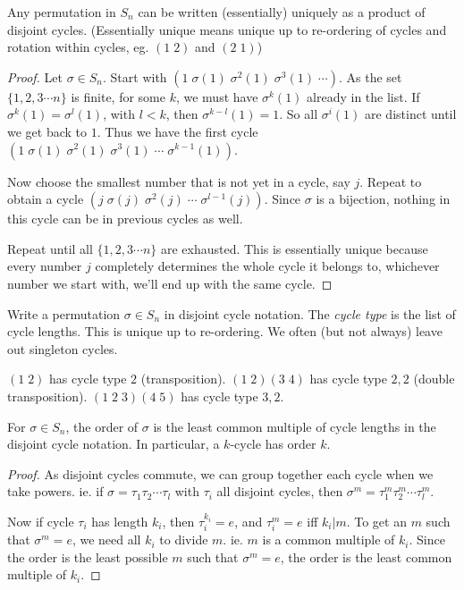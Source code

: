 \documentclass[a4paper]{article}
\begin{document}
\begin{thm}
  Any permutation in $S_n$ can be written (essentially) uniquely as a product of disjoint cycles. (Essentially unique means unique up to re-ordering of cycles and rotation within cycles, eg. $(1\; 2)$ and $(2\; 1)$)
\end{thm}

\begin{proof}
  Let $\sigma\in S_n$. Start with $(1\; \sigma(1)\; \sigma^2(1)\; \sigma^3(1)\;\cdots)$. As the set $\{1, 2, 3\cdots n\}$ is finite, for some $k$, we must have $\sigma^k(1)$ already in the list. If $\sigma^k(1) = \sigma^l(1)$, with $l < k$, then $\sigma^{k-l}(1) = 1$. So all $\sigma^i(1)$ are distinct until we get back to $1$. Thus we have the first cycle $(1\; \sigma(1)\; \sigma^2(1)\; \sigma^3(1)\;\cdots\;\sigma^{k-1}(1))$.

  Now choose the smallest number that is not yet in a cycle, say $j$. Repeat to obtain a cycle $(j\; \sigma(j)\; \sigma^2(j)\;\cdots\; \sigma^{l - 1}(j))$. Since $\sigma$ is a bijection, nothing in this cycle can be in previous cycles as well.

  Repeat until all $\{1, 2, 3\cdots n\}$ are exhausted. This is essentially unique because every number $j$ completely determines the whole cycle it belongs to, whichever number we start with, we'll end up with the same cycle.
\end{proof}

\begin{defi}
  Write a permutation $\sigma\in S_n$ in disjoint cycle notation. The \emph{cycle type} is the list of cycle lengths. This is unique up to re-ordering. We often (but not always) leave out singleton cycles.
\end{defi}
\begin{eg}
  $(1\; 2)$ has cycle type $2$ (transposition). $(1\; 2)(3\; 4)$ has cycle type $2, 2$ (double transposition). $(1\; 2\; 3)(4\; 5)$ has cycle type $3, 2$.
\end{eg}
\begin{lemma}
  For $\sigma\in S_n$, the order of $\sigma$ is the least common multiple of cycle lengths in the disjoint cycle notation. In particular, a $k$-cycle has order $k$.
\end{lemma}

\begin{proof}
  As disjoint cycles commute, we can group together each cycle when we take powers. ie. if $\sigma = \tau_1\tau_2\cdots\tau_l$ with $\tau_i$ all disjoint cycles, then $\sigma^m = \tau_1^m\tau_2^m\cdots\tau_l^m$.

  Now if cycle $\tau_i$ has length $k_i$, then $\tau_i^{k_i} = e$, and $\tau_i^m = e$ iff $k_i | m$. To get an $m$ such that $\sigma^m = e$, we need all $k_i$ to divide $m$. ie. $m$ is a common multiple of $k_i$. Since the order is the least possible $m$ such that $\sigma^m = e$, the order is the least common multiple of $k_i$.
\end{proof}
\end{document}
